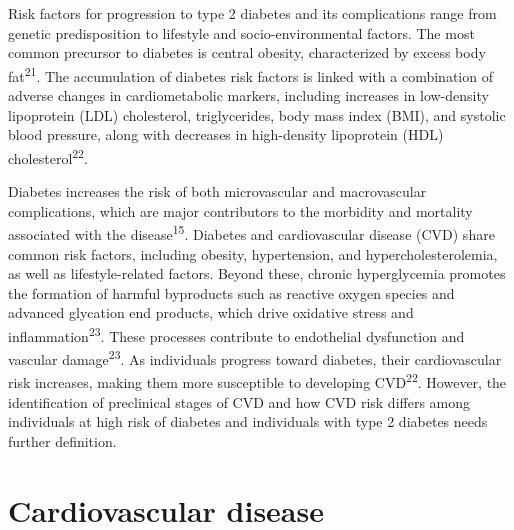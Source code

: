 \documentclass[
  a4paper,
  headsepline=true,
  open=any]{scrbook}
\begin{document}
Risk factors for progression to type 2 diabetes and its complications
range from genetic predisposition to lifestyle and socio-environmental
factors. The most common precursor to diabetes is central obesity,
characterized by excess body fat\textsuperscript{21}. The accumulation
of diabetes risk factors is linked with a combination of adverse changes
in cardiometabolic markers, including increases in low-density
lipoprotein (LDL) cholesterol, triglycerides, body mass index (BMI), and
systolic blood pressure, along with decreases in high-density
lipoprotein (HDL) cholesterol\textsuperscript{22}.

Diabetes increases the risk of both microvascular and macrovascular
complications, which are major contributors to the morbidity and
mortality associated with the disease\textsuperscript{15}. Diabetes and
cardiovascular disease (CVD) share common risk factors, including
obesity, hypertension, and hypercholesterolemia, as well as
lifestyle-related factors. Beyond these, chronic hyperglycemia promotes
the formation of harmful byproducts such as reactive oxygen species and
advanced glycation end products, which drive oxidative stress and
inflammation\textsuperscript{23}. These processes contribute to
endothelial dysfunction and vascular damage\textsuperscript{23}. As
individuals progress toward diabetes, their cardiovascular risk
increases, making them more susceptible to developing
CVD\textsuperscript{22}. However, the identification of preclinical
stages of CVD and how CVD risk differs among individuals at high risk of
diabetes and individuals with type 2 diabetes needs further definition.

\hypertarget{cardiovascular-disease}{%
\section{Cardiovascular disease}\label{cardiovascular-disease}}
\end{document}

